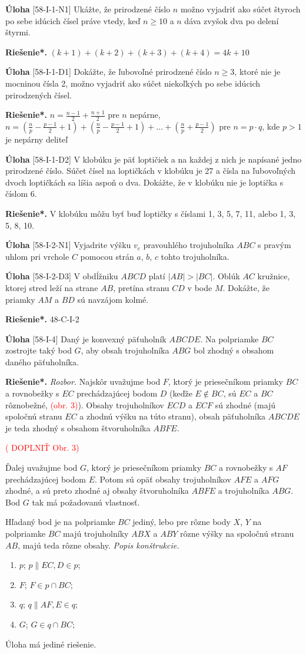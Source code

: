 \documentclass{article}
\newcommand{\rieh}{\textbf{Riešenie*.} }
\newcommand\todo[1]{\noindent\textcolor{red}{(#1)}}
\newcommand{\problem}[3]{
  \begin{tcolorbox}[breakable,notitle,boxrule=0pt,colback=light-gray,colframe=light-gray]
    \textbf{Úloha}
    [#1] #2
  \end{tcolorbox}
  \noindent#3
}
\begin{document}
\problem{58-I-1-N1}{
Ukážte, že prirodzené číslo $n$ možno vyjadriť ako súčet štyroch po sebe idúcich čísel práve vtedy, keď $n \geq 10$ a $n$ dáva zvyšok dva po delení štyrmi.
}{
\rieh $(k + 1) + (k + 2) + (k + 3) + (k + 4) = 4k + 10$
}


\problem{58-I-1-D1}{
Dokážte, že ľubovoľné prirodzené číslo $n \geq 3$, ktoré nie je mocninou čísla 2, možno
vyjadriť ako súčet niekoľkých po sebe idúcich prirodzených čísel.
}{
\rieh $n = \frac{n-1}{2}+ \frac{n+1}{2}$ pre
$n$ nepárne, $n = ( \frac{n}{p}-\frac{p-1}{2}+1)+(\frac{n}{p}-\frac{p-1}{2}+ 1) + \ldots + ( \frac{n}{p}+\frac{p-1}{2})$ pre $n = p\cdot q$, kde $p > 1$ je nepárny deliteľ
}


\problem{58-I-1-D2}{
V klobúku je päť loptičiek a na každej z nich je napísané jedno prirodzené číslo. Súčet
čísel na loptičkách v klobúku je 27 a čísla na ľubovoľných dvoch loptičkách sa líšia
aspoň o dva. Dokážte, že v klobúku nie je loptička s číslom 6.
}{
\rieh V klobúku môžu byť buď loptičky s číslami 1, 3, 5, 7, 11, alebo 1, 3, 5, 8, 10.
}

\problem{58-I-2-N1}{
Vyjadrite výšku $v_c$ pravouhlého trojuholníka $ABC$ s pravým uhlom pri vrchole $C$
pomocou strán $a$, $b$, $c$ tohto trojuholníka.
}{
}

\problem{58-I-2-D3}{
V obdĺžniku $ABCD$ platí $|AB| > |BC|$. Oblúk $AC$ kružnice, ktorej stred leží na strane $AB$, pretína stranu $CD$ v bode $M$. Dokážte, že priamky $AM$ a $BD$ sú navzájom
kolmé. 
}{
\rieh 48-C-I-2
}


\problem{58-I-4}{
Daný je konvexný päťuholník $ABCDE$. Na polpriamke $BC$ zostrojte taký bod $G$, aby
obsah trojuholníka $ABG$ bol zhodný s obsahom daného päťuholníka.
}{
\rieh \textit{Rozbor.} Najskôr uvažujme bod $F$, ktorý je priesečníkom priamky $BC$ a rovnobežky s $EC$ prechádzajúcej bodom $D$ (keďže $E\notin BC$, sú $EC$ a $BC$ rôznobežné, \todo{obr. 3}). Obsahy trojuholníkov $ECD$ a $ECF$ sú zhodné (majú spoločnú stranu $EC$ a zhodnú výšku na túto stranu), obsah päťuholníka $ABCDE$ je teda zhodný s obsahom štvoruholníka $ABFE$.

\todo{ DOPLNIŤ Obr. 3}

Ďalej uvažujme bod $G$, ktorý je priesečníkom priamky $BC$ a rovnobežky s $AF$
prechádzajúcej bodom $E$. Potom sú opäť obsahy trojuholníkov $AFE$ a $AFG$ zhodné, a sú preto zhodné aj obsahy štvoruholníka $ABFE$ a trojuholníka $ABG$. Bod $G$ tak má
požadovanú vlastnosť.

Hľadaný bod je na polpriamke $BC$ jediný, lebo pre rôzne body $X$, $Y$ na polpriamke $BC$ majú trojuholníky $ABX$ a $ABY$ rôzne výšky na spoločnú stranu $AB$, majú teda rôzne obsahy.
\textit{Popis konštrukcie.}
\begin{enumerate}
    \item $p$; $p \parallel EC, D \in p$;
    \item $F$; $F \in p \cap BC$;
    \item $q$; $q \parallel AF, E \in q$;
    \item $G$; $G \in q \cap BC$;
\end{enumerate}

Úloha má jediné riešenie.
}
\end{document}
